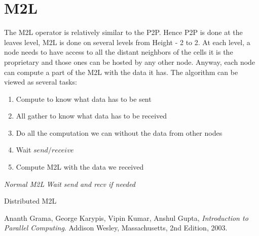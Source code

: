 \documentclass[12pt,letterpaper,titlepage]{report}
\begin{document}
\section{M2L}
The M2L operator is relatively similar to the P2P.
Hence P2P is done at the leaves level, M2L is done on several levels from Height - 2 to 2.
At each level, a node needs to have access to all the distant neighbors of the cells it is the proprietary and those ones can be hosted by any other node.
Anyway, each node can compute a part of the M2L with the data it has.
The algorithm can be viewed as several tasks:
\begin{enumerate}
\item Compute to know what data has to be sent
\item All gather to know what data has to be received
\item Do all the computation we can without the data from other nodes
\item Wait $send/receive$
\item Compute M2L with the data we received
\end{enumerate}
\BlankLine
\begin{algorithm}[H]
\linesnumbered
\SetLine
{}
\BlankLine
{}
\emph{Normal M2L}\;
\emph{Wait send and recv if needed}\;
\BlankLine
\caption{Distributed M2L}
\end{algorithm}
\begin{thebibliography}{9}
   Ananth Grama, George Karypis, Vipin Kumar, Anshul Gupta,
   \emph{Introduction to Parallel Computing}.
   Addison Wesley, Massachusetts,
   2nd Edition,
   2003.
\end{thebibliography}
\end{document}
